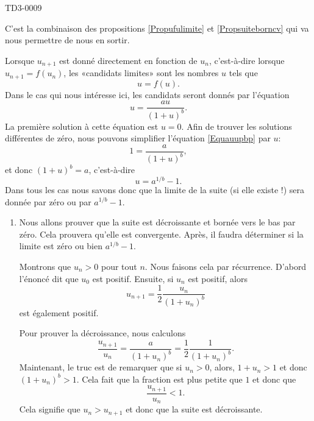 
\begin{corrige}{TD3-0009}

	C'est la combinaison des propositions \ref{Propufulimite} et \ref{Propsuiteborncv} qui va nous permettre de nous en sortir.

	Lorsque $u_{n+1}$ est donné directement en fonction de $u_n$, c'est-à-dire lorsque $u_{n+1}=f(u_n)$, les «candidats limites» sont les nombres $u$ tels que
	\begin{equation}
		u=f(u).
	\end{equation}
	Dans le cas qui nous intéresse ici, les candidats seront donnés par l'équation
	\begin{equation}		\label{Equauupbp}
		u=\frac{ au }{ (1+u)^b }.
	\end{equation}
	La première solution à cette équation est $u=0$. Afin de trouver les solutions différentes de zéro, nous pouvons simplifier l'équation \eqref{Equauupbp} par $u$:
	\begin{equation}
		1=\frac{ a }{ (1+u)^b },
	\end{equation}
	et donc $(1+u)^b=a$, c'est-à-dire
	\begin{equation}
		u=a^{1/b}-1.
	\end{equation}
	Dans tous les cas nous savons donc que la limite de la suite (si elle existe !) sera donnée par zéro ou par $a^{1/b}-1$.

	\begin{enumerate}
		\item
			Nous allons prouver que la suite est décroissante et bornée vers le bas par zéro. Cela prouvera qu'elle est convergente. Après, il faudra déterminer si la limite est zéro ou bien $a^{1/b}-1$.

			Montrons que $u_n>0$ pour tout $n$. Nous faisons cela par récurrence. D'abord l'énoncé dit que $u_0$ est positif. Ensuite, si $u_n$ est positif, alors
			\begin{equation}
				u_{n+1}=\frac{ 1 }{2}\frac{ u_n }{ (1+u_n)^b }
			\end{equation}
			est également positif.

			Pour prouver la décroissance, nous calculons
			\begin{equation}
				\frac{ u_{n+1} }{ u_n }=\frac{ a }{ (1+u_n)^b }=\frac{ 1 }{2}\frac{ 1 }{ (1+u_n)^b }.
			\end{equation}
			Maintenant, le truc est de remarquer que si $u_n>0$, alors, $1+u_n>1$ et donc $(1+u_n)^b>1$. Cela fait que la fraction est plus petite que $1$ et donc que
			\begin{equation}
				\frac{ u_{n+1} }{ u_n }<1.
			\end{equation}
			Cela signifie que $u_n>u_{n+1}$ et donc que la suite est décroissante.


\end{enumerate}
\end{corrige}
